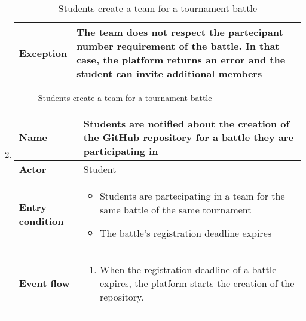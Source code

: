 \begin{enumerate}[label=\textbf{UC\arabic*}:,leftmargin=1.3cm]
\begin{table}[H]
\begin{tabular}{|l|p{11.9cm}|}
                        \textbf{Exception}       & The team does not respect the partecipant number requirement of the battle.
                        In that case, the platform returns an error and the student can invite additional members              \\\hline
                  \end{tabular}
                  \caption{Students create a team for a tournament battle}
                  \label{table:Students create a team for a tournament battle}
            \end{table}
            \pagebreak

            \begin{figure}[H]
                  \centering
                  \caption{Students create a team for a tournament battle}
                  \label{fig:Students create a team for a tournament battle}
            \end{figure}
            \pagebreak
      \item \textbf{}
            \begin{table}[H]
                  \centering
                  \begin{tabular}{|l|p{11.9cm}|}
                        \hline
                        \textbf{Name}            & Students are notified about the creation of the GitHub repository for a battle they are participating in                                    \\\hline
                        \textbf{Actor}           & Student                                                                           \\\hline
                        \textbf{Entry condition} &
                        \begin{itemize}
                              \item Students are partecipating in a team for the same battle of the same tournament
                              \item The battle's registration deadline expires
                        \end{itemize}                                                              \\\hline
                        \textbf{Event flow}      &
                        \begin{enumerate}[label=\arabic*.]
                              \item When the registration deadline of a battle expires, the platform starts the creation of the repository.

\end{enumerate}
\end{tabular}
\end{table}
\end{enumerate}
